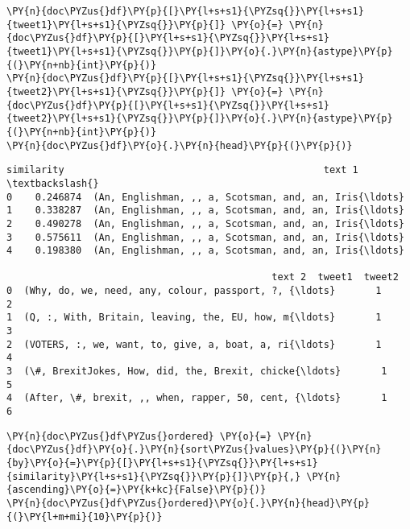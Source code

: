     \begin{tcolorbox}[breakable, size=fbox, boxrule=1pt, pad at break*=1mm,colback=cellbackground, colframe=cellborder]
\begin{Verbatim}[commandchars=\\\{\}]
\PY{n}{doc\PYZus{}df}\PY{p}{[}\PY{l+s+s1}{\PYZsq{}}\PY{l+s+s1}{tweet1}\PY{l+s+s1}{\PYZsq{}}\PY{p}{]} \PY{o}{=} \PY{n}{doc\PYZus{}df}\PY{p}{[}\PY{l+s+s1}{\PYZsq{}}\PY{l+s+s1}{tweet1}\PY{l+s+s1}{\PYZsq{}}\PY{p}{]}\PY{o}{.}\PY{n}{astype}\PY{p}{(}\PY{n+nb}{int}\PY{p}{)}
\PY{n}{doc\PYZus{}df}\PY{p}{[}\PY{l+s+s1}{\PYZsq{}}\PY{l+s+s1}{tweet2}\PY{l+s+s1}{\PYZsq{}}\PY{p}{]} \PY{o}{=} \PY{n}{doc\PYZus{}df}\PY{p}{[}\PY{l+s+s1}{\PYZsq{}}\PY{l+s+s1}{tweet2}\PY{l+s+s1}{\PYZsq{}}\PY{p}{]}\PY{o}{.}\PY{n}{astype}\PY{p}{(}\PY{n+nb}{int}\PY{p}{)}
\PY{n}{doc\PYZus{}df}\PY{o}{.}\PY{n}{head}\PY{p}{(}\PY{p}{)}
\end{Verbatim}
\end{tcolorbox}

            \begin{tcolorbox}[breakable, size=fbox, boxrule=.5pt, pad at break*=1mm, opacityfill=0]
\begin{Verbatim}[commandchars=\\\{\}]
   similarity                                             text 1  \textbackslash{}
0    0.246874  (An, Englishman, ,, a, Scotsman, and, an, Iris{\ldots}
1    0.338287  (An, Englishman, ,, a, Scotsman, and, an, Iris{\ldots}
2    0.490278  (An, Englishman, ,, a, Scotsman, and, an, Iris{\ldots}
3    0.575611  (An, Englishman, ,, a, Scotsman, and, an, Iris{\ldots}
4    0.198380  (An, Englishman, ,, a, Scotsman, and, an, Iris{\ldots}

                                              text 2  tweet1  tweet2
0  (Why, do, we, need, any, colour, passport, ?, {\ldots}       1       2
1  (Q, :, With, Britain, leaving, the, EU, how, m{\ldots}       1       3
2  (VOTERS, :, we, want, to, give, a, boat, a, ri{\ldots}       1       4
3  (\#, BrexitJokes, How, did, the, Brexit, chicke{\ldots}       1       5
4  (After, \#, brexit, ,, when, rapper, 50, cent, {\ldots}       1       6
\end{Verbatim}
\end{tcolorbox}
        
    \begin{tcolorbox}[breakable, size=fbox, boxrule=1pt, pad at break*=1mm,colback=cellbackground, colframe=cellborder]
\begin{Verbatim}[commandchars=\\\{\}]
\PY{n}{doc\PYZus{}df\PYZus{}ordered} \PY{o}{=} \PY{n}{doc\PYZus{}df}\PY{o}{.}\PY{n}{sort\PYZus{}values}\PY{p}{(}\PY{n}{by}\PY{o}{=}\PY{p}{[}\PY{l+s+s1}{\PYZsq{}}\PY{l+s+s1}{similarity}\PY{l+s+s1}{\PYZsq{}}\PY{p}{]}\PY{p}{,} \PY{n}{ascending}\PY{o}{=}\PY{k+kc}{False}\PY{p}{)}
\PY{n}{doc\PYZus{}df\PYZus{}ordered}\PY{o}{.}\PY{n}{head}\PY{p}{(}\PY{l+m+mi}{10}\PY{p}{)}
\end{Verbatim}
\end{tcolorbox}

